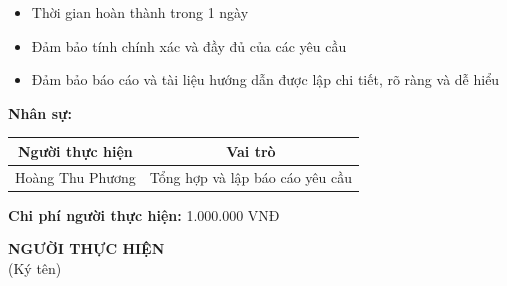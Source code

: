 {\begin{minipage}{\textwidth}
\begin{itemize}
            \item Thời gian hoàn thành trong 1 ngày
            \item Đảm bảo tính chính xác và đầy đủ của các yêu cầu
            \item Đảm bảo báo cáo và tài liệu hướng dẫn được lập chi tiết, rõ ràng và dễ hiểu
        \end{itemize}
        \noindent \textbf{Nhân sự:}
        \begin{longtable}{|c|c|}
        \hline
        \textbf{Người thực hiện} & \textbf{Vai trò} \\
        \hline
        Hoàng Thu Phương & Tổng hợp và lập báo cáo yêu cầu \\
        \hline
        \end{longtable}
        \noindent \textbf{Chi phí người thực hiện:} 1.000.000 VNĐ
        \vspace{1cm}
        \begin{flushleft}
            \hspace{8cm} \textbf{NGƯỜI THỰC HIỆN} \\
            \hspace{9.5cm} (Ký tên) \\
            \vspace{1cm}
        \end{flushleft}
    \end{minipage}
}
